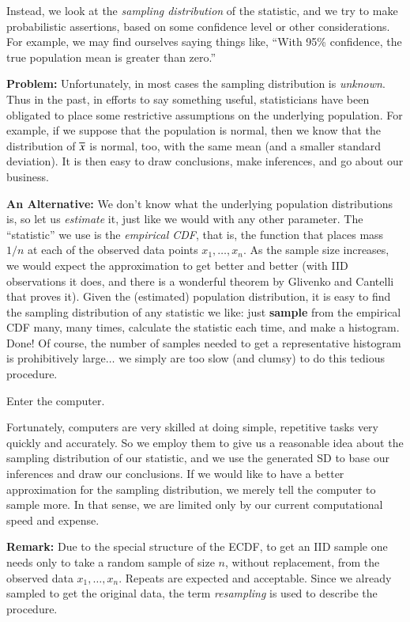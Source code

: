 \documentclass[captions=tableheading]{scrbook}
\begin{document}
Instead, we look at the \emph{sampling distribution} of the statistic, and we try to make probabilistic assertions, based on some confidence level or other considerations. For example, we may find ourselves saying things like, ``With 95\% confidence, the true population mean is greater than zero.''

\textbf{Problem:} Unfortunately, in most cases the sampling distribution is \emph{unknown}. Thus in the past, in efforts to say something useful, statisticians have been obligated to place some restrictive assumptions on the underlying population. For example, if we suppose that the population is normal, then we know that the distribution of $\overline{x}$ is normal, too, with the same mean (and a smaller standard deviation). It is then easy to draw conclusions, make inferences, and go about our business.

\textbf{An Alternative:} We don't know what the underlying population distributions is, so let us \emph{estimate} it, just like we would with any other parameter. The ``statistic'' we use is the \emph{empirical CDF}, that is, the function that places mass $1/n$ at each of the observed data points $x_{1},\ldots,x_{n}$. As the sample size increases, we would expect the approximation to get better and better (with IID observations it does, and there is a wonderful theorem by Glivenko and Cantelli that proves it). Given the (estimated) population distribution, it is easy to find the sampling distribution of any statistic we like: just \textbf{sample} from the empirical CDF many, many times, calculate the statistic each time, and make a histogram. Done! Of course, the number of samples needed to get a representative histogram is prohibitively large$\ldots$ we simply are too slow (and clumsy) to do this tedious procedure.

\begin{center}
Enter the computer. 
\end{center}

Fortunately, computers are very skilled at doing simple, repetitive tasks very quickly and accurately. So we employ them to give us a reasonable idea about the sampling distribution of our statistic, and we use the generated SD to base our inferences and draw our conclusions. If we would like to have a better approximation for the sampling distribution, we merely tell the computer to sample more. In that sense, we are limited only by our current computational speed and expense.

\textbf{Remark:} Due to the special structure of the ECDF, to get an IID sample one needs only to take a random sample of size $n$, without replacement, from the observed data $x_{1},\ldots,x_{n}$. Repeats are expected and acceptable. Since we already sampled to get the original data, the term \emph{resampling} is used to describe the procedure.
\end{document}
